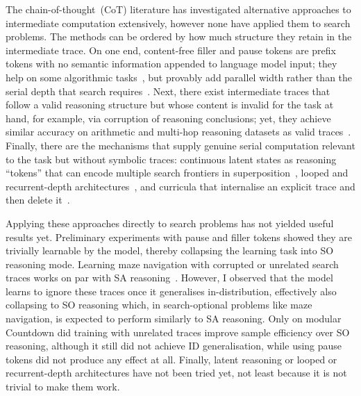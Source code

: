 The chain-of-thought~(CoT) literature has investigated alternative approaches to intermediate computation extensively, however none have applied them to search problems.
The methods can be ordered by how much structure they retain in the intermediate trace.
On one end, content-free filler and pause tokens are prefix tokens with no semantic information appended to language model input; they help on some algorithmic tasks~\citep{goyalPauseTokens2024,pfauLetsThinkDot2024}, but provably add parallel width rather than the serial depth that search requires~\citep{londonPauseExpressivity2025,pfauLetsThinkDot2024}.
Next, there exist intermediate traces that follow a valid reasoning structure but whose content is invalid for the task at hand, for example, via corruption of reasoning conclusions; yet, they achieve similar accuracy on arithmetic and multi-hop reasoning datasets as valid traces~\citep{wangUnderstandingCoTPrompting2023}.
Finally, there are the mechanisms that supply genuine serial computation relevant to the task but without symbolic traces: continuous latent states as reasoning ``tokens'' that can encode multiple search frontiers in superposition~\citep{haoTrainingLargeLanguage2025,zhuReasoningSuperpositionTheoretical2025}, looped and recurrent-depth architectures~\citep{saunshiLoopedTransformers2025,geipingRecurrentDepth2025}, and curricula that internalise an explicit trace and then delete it~\citep{dengExplicitToImplicitCoT2024,zelikmanQuietSTaR2024}.

Applying these approaches directly to search problems has not yielded useful results yet.
Preliminary experiments with pause and filler tokens showed they are trivially learnable by the model, thereby collapsing the learning task into SO reasoning mode.
Learning maze navigation with corrupted or unrelated search traces works on par with SA reasoning~\citep{suDualformerControllableFast2025,valmeekamSemanticsUnreasonableEffectiveness2025}.
However, I observed that the model learns to ignore these traces once it generalises in-distribution, effectively also collapsing to SO reasoning which, in search-optional problems like maze navigation, is expected to perform similarly to SA reasoning.
Only on modular Countdown did training with unrelated traces improve sample efficiency over SO reasoning, although it still did not achieve ID generalisation, while using pause tokens did not produce any effect at all.
Finally, latent reasoning or looped or recurrent-depth architectures have not been tried yet, not least because it is not trivial to make them work.


